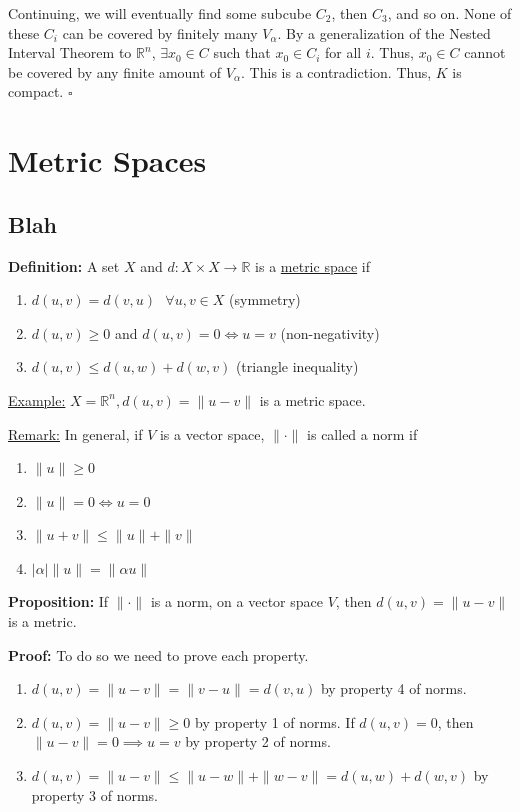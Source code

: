 \documentclass{article}
\newcommand*{\qed}{\hfill$\square$}%
\newcommand*{\txt}[1]{\text{ #1 }}%
\newcommand*{\fora}{\txt{}\forall}%
\newcommand*{\rr}{\mathbb{R}}%
\begin{document}
Continuing, we will eventually find some subcube $C_2$, then $C_3$, and so on. None of these $C_i$ can be covered by finitely many $V_\alpha$. By a generalization of the Nested Interval Theorem to $\rr^n$, $\exists x_0\in C$ such that $x_0\in C_i$ for all $i$. Thus, $x_0\in C$ cannot be covered by any finite amount of $V_\alpha$. This is a contradiction. Thus, $K$ is compact. \qed

\section{Metric Spaces}
\subsection{Blah}
\textbf{Definition:} A set $X$ and $d:X\times X\to \rr$ is a \underline{metric space} if \begin{enumerate}
    \item $d(u,v)=d(v,u)\fora u,v\in X$ (symmetry)
    \item $d(u,v)\geq 0$ and $d(u,v)=0\iff u=v$ (non-negativity)
    \item $d(u,v)\leq d(u,w)+d(w,v)$ (triangle inequality)
\end{enumerate}

\underline{Example:} $X=\rr^n,d(u,v)=\|u-v\|$ is a metric space.

\underline{Remark:} In general, if $V$ is a vector space, $\|\cdot\|$ is called a norm if\begin{enumerate}
    \item $\|u\|\geq 0$
    \item $\|u\|=0\iff u=0$
    \item $\|u+v\|\leq \|u\|+\|v\|$
    \item $|\alpha|\|u\|=\|\alpha u\|$
\end{enumerate}

\textbf{Proposition:} If $\|\cdot\|$ is a norm, on a vector space $V$, then $d(u,v)=\|u-v\|$ is a metric.

\textbf{Proof:} To do so we need to prove each property.\begin{enumerate}
    \item $d(u,v)=\|u-v\|=\|v-u\|=d(v,u)$ by property 4 of norms.
    \item $d(u,v)=\|u-v\|\geq 0$ by property 1 of norms. If $d(u,v)=0$, then $\|u-v\|=0\implies u=v$ by property 2 of norms.
    \item $d(u,v)=\|u-v\|\leq \|u-w\|+\|w-v\|=d(u,w)+d(w,v)$ by property 3 of norms.
\end{enumerate}
\end{document}
